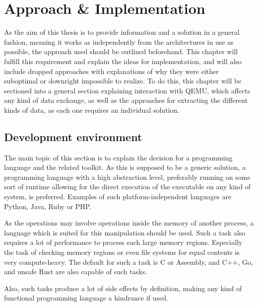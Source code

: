 \chapter{Approach \& Implementation}
As the aim of this thesis is to provide information and a solution in a general fashion,
meaning it works as independently from the architectures in use as possible,
the approach used should be outlined beforehand.
This chapter will fulfill this requirement
and explain the ideas for implementation,
and will also include dropped approaches with explanations of
why they were either suboptimal or downright impossible to realize.
To do this, this chapter will be sectioned into a general section explaining interaction with QEMU,
which affects any kind of data exchange,
as well as the approaches for extracting the different kinds of data,
as each one requires an individual solution.

\section{Development environment}
The main topic of this section is to explain the decision for a programming language and the related toolkit.
As this is supposed to be a generic solution, a programming language with a high abstraction level,
preferably running on some sort of runtime allowing for the direct execution of the executable on any kind of system, is preferred.
Examples of such platform-independent languages are Python, Java, Ruby or PHP.

As the operations may involve operations inside the memory of another process,
a language which is suited for this manipulation should be used.
Such a task also requires a lot of performance to process such large memory regions.
Especially the task of checking memory regions or even file systems for equal contents is very compute-heavy.
The default for such a task is C or Assembly, and C++, Go, and unsafe Rust are also capable of such tasks.

Also, such tasks produce a lot of side effects by definition,
making any kind of functional programming language a hindrance if used.


